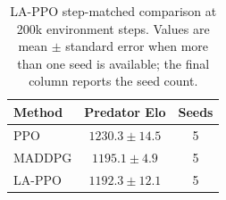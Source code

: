 \begin{table}[t]
\centering
\caption{LA-PPO step-matched comparison at 200k environment steps. Values are mean $\pm$ standard error when more than one seed is available; the final column reports the seed count.}
\label{tab:lappo_step_matched}
\begin{tabular}{lcc}
\toprule
Method & Predator Elo & Seeds \\
\midrule
PPO & $1230.3 \pm 14.5$ & 5 \\
MADDPG & $1195.1 \pm 4.9$ & 5 \\
LA-PPO & $1192.3 \pm 12.1$ & 5 \\
\bottomrule
\end{tabular}
\end{table}
